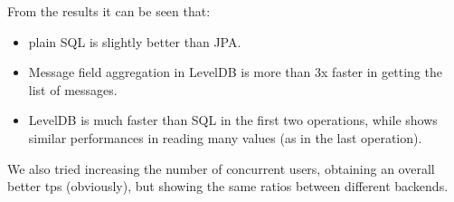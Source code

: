 \documentclass[10pt]{article}
\begin{document}
From the results it can be seen that:
\begin{itemize}
    \item plain SQL is slightly better than JPA.
    \item Message field aggregation in LevelDB is more than 3x faster in getting 
            the list of messages.
    \item LevelDB is much faster than SQL in the first two operations, while shows
            similar performances in reading many values (as in the last operation).
\end{itemize}

We also tried increasing the number of concurrent users, obtaining an overall 
better tps (obviously), but showing the same ratios between different backends.
\end{document}
